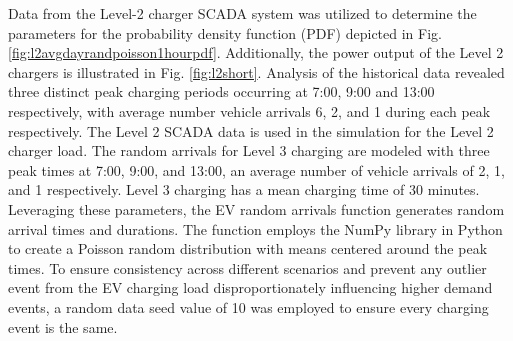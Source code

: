 \documentclass[conference]{IEEEtran}
\begin{document}
	Data from the Level-2 charger SCADA system was utilized to determine the parameters for the probability density function (PDF) depicted in Fig. \ref{fig:l2avgdayrandpoisson1hourpdf}. Additionally, the power output of the Level 2 chargers is illustrated in Fig. \ref{fig:l2short}. Analysis of the historical data revealed three distinct peak charging periods occurring at 7:00, 9:00 and  13:00 respectively, with average number vehicle arrivals 6, 2, and 1 during each peak respectively.  The Level 2 SCADA data is used in the simulation for the Level 2 charger load.  The random arrivals for Level 3 charging are modeled with three peak times at 7:00, 9:00, and 13:00, an average number of vehicle arrivals of 2, 1,  and 1  respectively. Level 3 charging has a mean charging time of 30 minutes.  Leveraging these parameters, the EV random arrivals function generates random arrival times and durations. The function employs the NumPy library\cite{NumPy}\cite{numpy_poi} in Python to create a Poisson random distribution with means centered around the peak times. To ensure consistency across different scenarios and prevent any outlier event from the EV charging load disproportionately influencing higher demand events, a random data seed value of 10 was employed to ensure every charging event is the same. 
\end{document}

